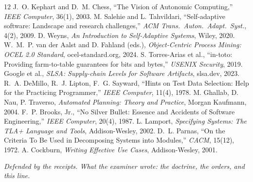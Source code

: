 \documentclass[11pt,a4paper]{article}
\theoremstyle{remark}
\begin{document}
\begin{thebibliography}{12}
 J.~O. Kephart and D.~M. Chess, ``The Vision of Autonomic Computing,'' \emph{IEEE Computer}, 36(1), 2003.
 M. Salehie and L. Tahvildari, ``Self-adaptive software: Landscape and research challenges,'' \emph{ACM Trans.\ Auton.\ Adapt.\ Syst.}, 4(2), 2009.
 D. Weyns, \emph{An Introduction to Self-Adaptive Systems}, Wiley, 2020.
 W.~M.~P. van der Aalst and D. Fahland (eds.), \emph{Object-Centric Process Mining: OCEL 2.0 Standard}, ocel-standard.org, 2024.
 S. Torres-Arias et al., ``in-toto: Providing farm-to-table guarantees for bits and bytes,'' \emph{USENIX Security}, 2019.
 Google et al., \emph{SLSA: Supply-chain Levels for Software Artifacts}, slsa.dev, 2023.
 R.~A. DeMillo, R.~J. Lipton, F.~G. Sayward, ``Hints on Test Data Selection: Help for the Practicing Programmer,'' \emph{IEEE Computer}, 11(4), 1978.
 M. Ghallab, D. Nau, P. Traverso, \emph{Automated Planning: Theory and Practice}, Morgan Kaufmann, 2004.
 F.~P. Brooks, Jr., ``No Silver Bullet: Essence and Accidents of Software Engineering,'' \emph{IEEE Computer}, 20(4), 1987.
 L. Lamport, \emph{Specifying Systems: The TLA+ Language and Tools}, Addison-Wesley, 2002.
 D.~L. Parnas, ``On the Criteria To Be Used in Decomposing Systems into Modules,'' \emph{CACM}, 15(12), 1972.
 A. Cockburn, \emph{Writing Effective Use Cases}, Addison-Wesley, 2001.
\end{thebibliography}

\vspace{1.5em}
\noindent\emph{Defended by the receipts. What the examiner wrote: the doctrine, the orders, and this line.}
\end{document}
